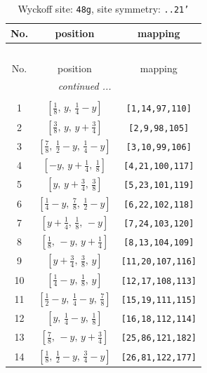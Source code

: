 \documentclass[fleqn,8pt]{jsarticle}
\begin{document}
\begin{longtable}{ccc}
\caption{Wyckoff site: {\tt 48g}, site symmetry: {\tt ..21'}}
 \\
 \hline \hline
No. & position & mapping \\ \hline \endfirsthead

\multicolumn{2}{l}{\tablename\ \thetable{}} \\
 \hline \hline
No. & position & mapping \\ \hline \endhead

 \hline \hline
\multicolumn{2}{r}{\footnotesize\it continued ...} \\ \endfoot

 \hline \hline
\multicolumn{2}{r}{} \\ \endlastfoot

1 & $\left[ \frac{1}{8},\, y,\, \frac{1}{4} - y \right]$ & {\tt [1,14,97,110]} \\ \hline
2 & $\left[ \frac{3}{8},\, y,\, y + \frac{3}{4} \right]$ & {\tt [2,9,98,105]} \\ \hline
3 & $\left[ \frac{7}{8},\, \frac{1}{2} - y,\, \frac{1}{4} - y \right]$ & {\tt [3,10,99,106]} \\ \hline
4 & $\left[ - y,\, y + \frac{1}{4},\, \frac{1}{8} \right]$ & {\tt [4,21,100,117]} \\ \hline
5 & $\left[ y,\, y + \frac{3}{4},\, \frac{3}{8} \right]$ & {\tt [5,23,101,119]} \\ \hline
6 & $\left[ \frac{1}{4} - y,\, \frac{7}{8},\, \frac{1}{2} - y \right]$ & {\tt [6,22,102,118]} \\ \hline
7 & $\left[ y + \frac{1}{4},\, \frac{1}{8},\, - y \right]$ & {\tt [7,24,103,120]} \\ \hline
8 & $\left[ \frac{1}{8},\, - y,\, y + \frac{1}{4} \right]$ & {\tt [8,13,104,109]} \\ \hline
9 & $\left[ y + \frac{3}{4},\, \frac{3}{8},\, y \right]$ & {\tt [11,20,107,116]} \\ \hline
10 & $\left[ \frac{1}{4} - y,\, \frac{1}{8},\, y \right]$ & {\tt [12,17,108,113]} \\ \hline
11 & $\left[ \frac{1}{2} - y,\, \frac{1}{4} - y,\, \frac{7}{8} \right]$ & {\tt [15,19,111,115]} \\ \hline
12 & $\left[ y,\, \frac{1}{4} - y,\, \frac{1}{8} \right]$ & {\tt [16,18,112,114]} \\ \hline
13 & $\left[ \frac{7}{8},\, - y,\, y + \frac{3}{4} \right]$ & {\tt [25,86,121,182]} \\ \hline
14 & $\left[ \frac{1}{8},\, \frac{1}{2} - y,\, \frac{3}{4} - y \right]$ & {\tt [26,81,122,177]} \\ \hline

\end{longtable}
\end{document}
